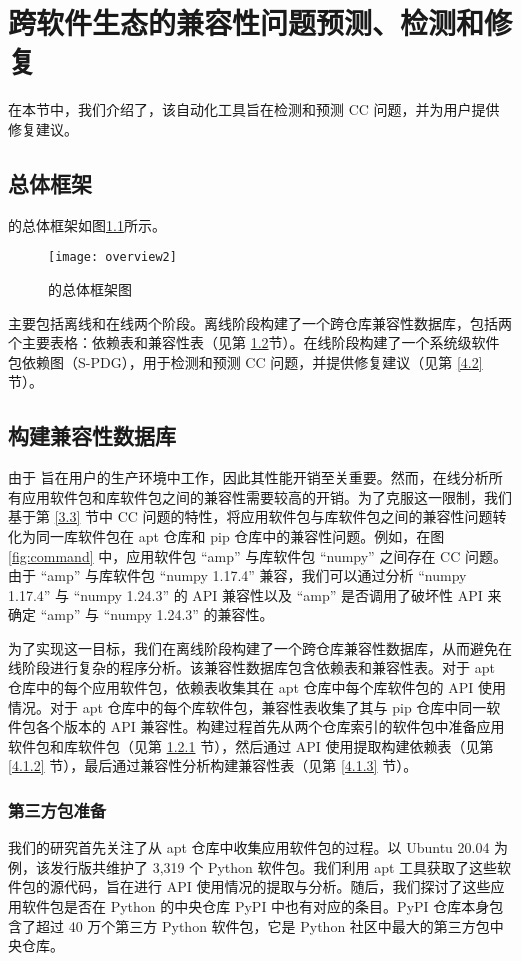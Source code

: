 \chapter{跨软件生态的兼容性问题预测、检测和修复}
在本节中，我们介绍了\tool{}，该自动化工具旨在检测和预测 CC 问题，并为用户提供修复建议。

\section{总体框架}
\tool{}的总体框架如图\ref{fig:overview}所示。
\begin{figure}[htbp] %
	\centering
	\texttt{[image: overview2]}
	\caption{\tool{}的总体框架图}
	\label{fig:overview}
\end{figure}
\tool{}主要包括离线和在线两个阶段。离线阶段构建了一个跨仓库兼容性数据库，包括两个主要表格：依赖表和兼容性表（见第 \ref{4.1}节）。在线阶段构建了一个系统级软件包依赖图（S-PDG），用于检测和预测 CC 问题，并提供修复建议（见第 \ref{4.2} 节）。

\section{构建兼容性数据库}\label{4.1}
由于 \tool{} 旨在用户的生产环境中工作，因此其性能开销至关重要。然而，在线分析所有应用软件包和库软件包之间的兼容性需要较高的开销。为了克服这一限制，我们基于第 \ref{3.3} 节中 CC 问题的特性，将应用软件包与库软件包之间的兼容性问题转化为同一库软件包在 apt 仓库和 pip 仓库中的兼容性问题。例如，在图 \ref{fig:command} 中，应用软件包 “amp” 与库软件包 “numpy” 之间存在 CC 问题。由于 “amp” 与库软件包 “numpy 1.17.4” 兼容，我们可以通过分析 “numpy 1.17.4” 与 “numpy 1.24.3” 的 API 兼容性以及 “amp” 是否调用了破坏性 API 来确定 “amp” 与 “numpy 1.24.3” 的兼容性。

为了实现这一目标，我们在离线阶段构建了一个跨仓库兼容性数据库，从而避免在线阶段进行复杂的程序分析。该兼容性数据库包含依赖表和兼容性表。对于 apt 仓库中的每个应用软件包，依赖表收集其在 apt 仓库中每个库软件包的 API 使用情况。对于 apt 仓库中的每个库软件包，兼容性表收集了其与 pip 仓库中同一软件包各个版本的 API 兼容性。构建过程首先从两个仓库索引的软件包中准备应用软件包和库软件包（见第 \ref{4.1.1} 节），然后通过 API 使用提取构建依赖表（见第 \ref{4.1.2} 节），最后通过兼容性分析构建兼容性表（见第 \ref{4.1.3} 节）。

\subsection{第三方包准备}\label{4.1.1}
我们的研究首先关注了从 apt 仓库中收集应用软件包的过程。以 Ubuntu 20.04 为例，该发行版共维护了 3,319 个 Python 软件包。我们利用 apt 工具获取了这些软件包的源代码，旨在进行 API 使用情况的提取与分析。随后，我们探讨了这些应用软件包是否在 Python 的中央仓库 PyPI  中也有对应的条目。PyPI 仓库本身包含了超过 40 万个第三方 Python 软件包，它是 Python 社区中最大的第三方包中央仓库。

